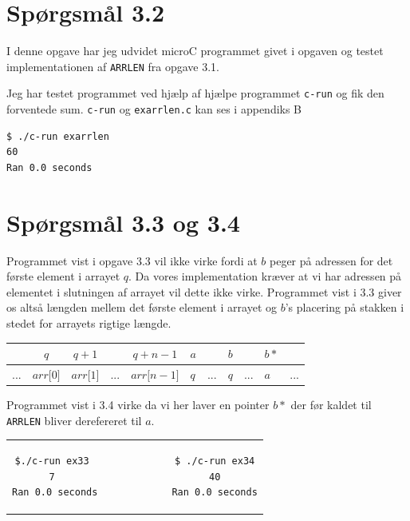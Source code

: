 \documentclass[danish,a4paper]{report}
\begin{document}
\section*{Spørgsmål 3.2}

I denne opgave har jeg udvidet microC programmet givet i opgaven og testet implementationen af \texttt{ARRLEN} fra opgave 3.1.



Jeg har testet programmet ved hjælp af hjælpe programmet \texttt{c-run} og fik den forventede sum. \texttt{c-run} og \texttt{exarrlen.c} kan ses i appendiks B

\begin{lstlisting}[language=bash]
$ ./c-run exarrlen
60
Ran 0.0 seconds
\end{lstlisting}

\section*{Spørgsmål 3.3 og 3.4}

Programmet vist i opgave 3.3 vil ikke virke fordi at $b$ peger på adressen for det første element i arrayet $q$. Da vores implementation kræver at vi har adressen på elementet i slutningen af arrayet vil dette ikke virke. Programmet vist i 3.3 giver os altså længden mellem det første element i arrayet og $b$'s placering på stakken i stedet for arrayets rigtige længde.

\begin{table}[h]
\centering
\begin{tabular}{ccccccccccc}
& $q$ & $q+1$ & & $q+n-1$ & $a$ & & $b$ & & $b*$ & \\  \hline
\multicolumn{1}{l|}{...} & \multicolumn{1}{l|}{$arr{[}0{]}$} & \multicolumn{1}{l|}{$arr{[}1{]}$} & \multicolumn{1}{l|}{...} & \multicolumn{1}{l|}{$arr{[}n-1{]}$} & \multicolumn{1}{l|}{$q$} & \multicolumn{1}{l|}{...} & \multicolumn{1}{l|}{$q$} & \multicolumn{1}{l|}{...} & \multicolumn{1}{l|}{$a$} & ... \\ \hline
\end{tabular}
\end{table}

Programmet vist i 3.4 virke da vi her laver en pointer $b*$ der før kaldet til \texttt{ARRLEN} bliver derefereret til $a$.\\
\begin{center}
\begin{tabular}{c}
\begin{lstlisting}[language=bash]
$./c-run ex33               $ ./c-run ex34
7                           40
Ran 0.0 seconds             Ran 0.0 seconds

\end{lstlisting}
\end{tabular}
\end{center}
\end{document}
